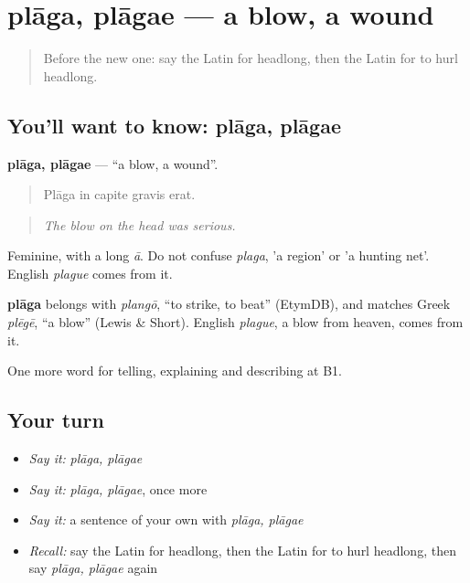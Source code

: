 \section[plāga, plāgae]{plāga, plāgae — a blow, a wound}

\label{lesson:LA-C314-plaga}



\begin{quote}
Before the new one: say the Latin for headlong, then the Latin for to hurl headlong.
\end{quote}

\subsection*{You'll want to know: plāga, plāgae}
\textbf{plāga, plāgae} — \textquotedblleft{}a blow, a wound\textquotedblright{}.

\begin{quote}
Plāga in capite gravis erat.
\end{quote}

\begin{quote}
\emph{The blow on the head was serious.}
\end{quote}

Feminine, with a long \emph{ā}. Do not confuse \emph{plaga}, 'a region' or 'a hunting net'. English \emph{plague} comes from it.

\begin{cousinweb}
\textbf{plāga} belongs with \emph{plangō}, \textquotedblleft{}to strike, to beat\textquotedblright{} (EtymDB), and matches Greek \emph{plēgē}, \textquotedblleft{}a blow\textquotedblright{} (Lewis \& Short). English \emph{plague}, a blow from heaven, comes from it.
\end{cousinweb}

\begin{grammarlens}[title={What you've built}]
One more word for telling, explaining and describing at B1.
\end{grammarlens}

\subsection*{Your turn}
\begin{itemize}
\raggedright
  \item \emph{Say it:} \emph{plāga, plāgae}
  \item \emph{Say it:} \emph{plāga, plāgae}, once more
  \item \emph{Say it:} a sentence of your own with \emph{plāga, plāgae}
  \item \emph{Recall:} say the Latin for headlong, then the Latin for to hurl headlong, then say \emph{plāga, plāgae} again
\end{itemize}

